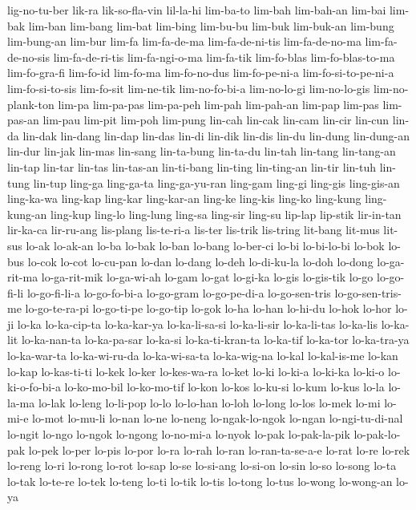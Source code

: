 {lig-no-tu-ber lik-ra lik-so-fla-vin lil-la-hi lim-ba-to lim-bah lim-bah-an
lim-bai lim-bak lim-ban lim-bang lim-bat lim-bing lim-bu-bu lim-buk
lim-buk-an lim-bung lim-bung-an lim-bur lim-fa lim-fa-de-ma
lim-fa-de-ni-tis lim-fa-de-no-ma lim-fa-de-no-sis lim-fa-de-ri-tis
lim-fa-ngi-o-ma lim-fa-tik lim-fo-blas lim-fo-blas-to-ma lim-fo-gra-fi
lim-fo-id lim-fo-ma lim-fo-no-dus lim-fo-pe-ni-a lim-fo-si-to-pe-ni-a
lim-fo-si-to-sis lim-fo-sit lim-ne-tik lim-no-fo-bi-a lim-no-lo-gi
lim-no-lo-gis lim-no-plank-ton lim-pa lim-pa-pas lim-pa-peh lim-pah
lim-pah-an lim-pap lim-pas lim-pas-an lim-pau lim-pit lim-poh lim-pung
lin-cah lin-cak lin-cam lin-cir lin-cun lin-da lin-dak lin-dang lin-dap
lin-das lin-di lin-dik lin-dis lin-du lin-dung lin-dung-an lin-dur lin-jak
lin-mas lin-sang lin-ta-bung lin-ta-du lin-tah lin-tang lin-tang-an
lin-tap lin-tar lin-tas lin-tas-an lin-ti-bang lin-ting lin-ting-an
lin-tir lin-tuh lin-tung lin-tup ling-ga ling-ga-ta ling-ga-yu-ran
ling-gam ling-gi ling-gis ling-gis-an ling-ka-wa ling-kap ling-kar
ling-kar-an ling-ke ling-kis ling-ko ling-kung ling-kung-an ling-kup
ling-lo ling-lung ling-sa ling-sir ling-su lip-lap lip-stik lir-in-tan
lir-ka-ca lir-ru-ang lis-plang lis-te-ri-a lis-ter lis-trik lis-tring
lit-bang lit-mus lit-sus lo-ak lo-ak-an lo-ba lo-bak lo-ban lo-bang
lo-ber-ci lo-bi lo-bi-lo-bi lo-bok lo-bus lo-cok lo-cot lo-cu-pan lo-dan
lo-dang lo-deh lo-di-ku-la lo-doh lo-dong lo-ga-rit-ma lo-ga-rit-mik
lo-ga-wi-ah lo-gam lo-gat lo-gi-ka lo-gis lo-gis-tik lo-go lo-go-fi-li
lo-go-fi-li-a lo-go-fo-bi-a lo-go-gram lo-go-pe-di-a lo-go-sen-tris
lo-go-sen-tris-me lo-go-te-ra-pi lo-go-ti-pe lo-go-tip lo-gok lo-ha lo-han
lo-hi-du lo-hok lo-hor lo-ji lo-ka lo-ka-cip-ta lo-ka-kar-ya
lo-ka-li-sa-si lo-ka-li-sir lo-ka-li-tas lo-ka-lis lo-ka-lit lo-ka-nan-ta
lo-ka-pa-sar lo-ka-si lo-ka-ti-kran-ta lo-ka-tif lo-ka-tor lo-ka-tra-ya
lo-ka-war-ta lo-ka-wi-ru-da lo-ka-wi-sa-ta lo-ka-wig-na lo-kal
lo-kal-is-me lo-kan lo-kap lo-kas-ti-ti lo-kek lo-ker lo-kes-wa-ra lo-ket
lo-ki lo-ki-a lo-ki-ka lo-ki-o lo-ki-o-fo-bi-a lo-ko-mo-bil lo-ko-mo-tif
lo-kon lo-kos lo-ku-si lo-kum lo-kus lo-la lo-la-ma lo-lak lo-leng
lo-li-pop lo-lo lo-lo-han lo-loh lo-long lo-los lo-mek lo-mi lo-mi-e
lo-mot lo-mu-li lo-nan lo-ne lo-neng lo-ngak-lo-ngok lo-ngan
lo-ngi-tu-di-nal lo-ngit lo-ngo lo-ngok lo-ngong lo-no-mi-a lo-nyok lo-pak
lo-pak-la-pik lo-pak-lo-pak lo-pek lo-per lo-pis lo-por lo-ra lo-rah
lo-ran lo-ran-ta-se-a-e lo-rat lo-re lo-rek lo-reng lo-ri lo-rong lo-rot
lo-sap lo-se lo-si-ang lo-si-on lo-sin lo-so lo-song lo-ta lo-tak lo-te-re
lo-tek lo-teng lo-ti lo-tik lo-tis lo-tong lo-tus lo-wong lo-wong-an lo-ya
}
